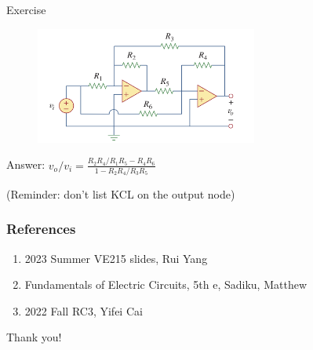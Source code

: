 \documentclass{beamer}
\begin{document}
\begin{frame}{Exercise}
\begin{figure}[H]
    \centering
    \includegraphics[width=0.65\textwidth]{img_opamp/exercise2.png}
\end{figure}

Answer: $v_o/v_i = \frac{R_2R_4/R_1R_5-R_4R_6}{1-R_2R_4/R_3R_5}$

(Reminder: don't list KCL on the output node)
    
\end{frame}




\begin{frame}
\frametitle{References}
\begin{enumerate}
\item 2023 Summer VE215 slides, Rui Yang
\item Fundamentals of Electric Circuits, 5th e, Sadiku, Matthew
\item 2022 Fall RC3, Yifei Cai
\end{enumerate}
\end{frame}


\begin{frame}
\Huge{\centerline{Thank you!}}
\end{frame}
\end{document}
